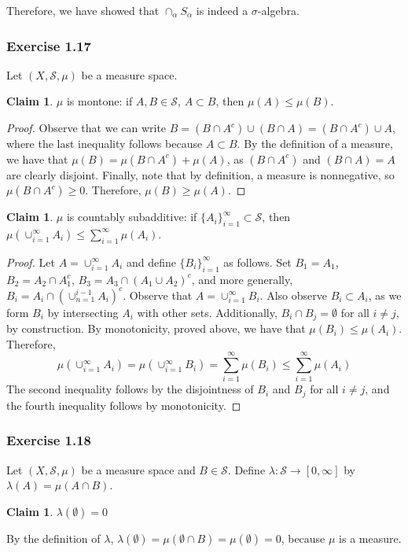 \documentclass[letterpaper,12pt]{article}
\theoremstyle{definition}
\newtheorem{claim}[theorem]{Claim}
\begin{document}
Therefore, we have showed that $\cap_{\alpha} S_{\alpha}$ is indeed a $\sigma$-algebra.

\subsubsection*{Exercise 1.17}
Let $(X,\mathcal{S}, \mu)$ be a measure space.
\begin{claim}
  $\mu$ is montone: if $A,B \in \mathcal{S}$, $A \subset B$, then $\mu(A) \leq \mu(B)$.
\end{claim}
\begin{proof}
  Observe that we can write $B = (B \cap A^c) \cup (B \cap A) = (B \cap A^c) \cup A$, where the last inequality follows because $A \subset B$. By the definition of a measure, we have that $\mu(B) = \mu(B \cap A^c) + \mu(A)$, as $(B \cap A^c)$ and $(B \cap A) = A$ are clearly disjoint. Finally, note that by definition, a measure is nonnegative, so $\mu(B \cap A^c) \geq 0$. Therefore, $\mu(B) \geq \mu(A)$.
\end{proof}

\begin{claim}
  $\mu$ is countably subadditive: if $\{A_i\}_{i=1}^{\infty} \subset \mathcal{S}$, then $\mu(\cup_{i=1}^{\infty} A_i) \leq \sum_{i=1}^{\infty} \mu(A_i)$.
\end{claim}
\begin{proof}
  Let $A = \cup_{i=1}^{\infty} A_i$ and define $\{B_i\}_{i=1}^{\infty}$ as follows. Set $B_1 = A_1$, $B_2 = A_2 \cap A_1^c$, $B_3 = A_3 \cap (A_1 \cup A_2)^c$, and more generally, $B_i = A_i \cap (\cup_{n=1}^{i-1} A_i)^c$. Observe that $A = \cup_{i=1}^{\infty} B_i$. Also observe $B_i \subset A_i$, as we form $B_i$ by intersecting $A_i$ with other sets. Additionally, $B_i \cap B_j = \emptyset$ for all $i \ne j$, by construction. By monotonicity, proved above, we have that $\mu(B_i) \leq \mu(A_i)$. Therefore,
  \begin{equation}
    \mu(\cup_{i=1}^{\infty} A_i) = \mu(\cup_{i=1}^{\infty} B_i) = \sum_{i=1}^{\infty} \mu(B_i) \leq \sum_{i=1}^{\infty} \mu(A_i)
  \end{equation}
The second inequality follows by the disjointness of $B_i$ and $B_j$ for all $i \ne j$, and the fourth inequality follows by monotonicity.
\end{proof}
\subsubsection*{Exercise 1.18}
Let $(X,\mathcal{S}, \mu)$ be a measure space and $B \in \mathcal{S}$. Define $\lambda : \mathcal{S} \rightarrow [0,\infty]$ by $\lambda(A) = \mu(A \cap B)$.
\begin{claim}
  $\lambda(\emptyset) = 0$
\end{claim}
By the definition of $\lambda$, $\lambda(\emptyset) = \mu(\emptyset \cap B) = \mu (\emptyset) = 0$, because $\mu$ is a measure.
\end{document}
